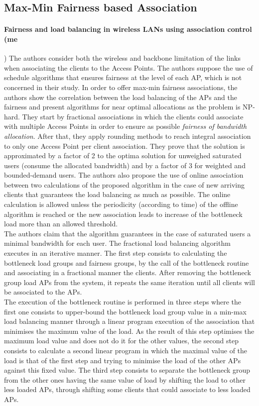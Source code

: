 \documentclass[journal,transmag]{IEEEtran}
\begin{document}
\subsection{Max-Min Fairness based Association}
 \paragraph{Fairness and load balancing in wireless LANs using association control  
\cite{04Fairness_load_balancing_WLAN,07fairness_load_balancing_LAN} (me})
The authors consider both the wireless and backbone limitation of the links when associating the clients to the Access Points. The authors suppose the use of schedule algorithms that ensures fairness at the level of each AP, which is not concerned in their study. In order to offer max-min fairness associations, the authors show the correlation between the load balancing of the APs and the fairness and present algorithms for near optimal allocations as the problem is NP-hard. They start by fractional associations in which the clients could associate with multiple Access Points in order to ensure as possible \textit{fairness of bandwidth allocation}. After that, they apply rounding methods to reach integral association to only one Access Point per client association. They prove that the solution is approximated by a factor of 2 to the optima solution for unweighed saturated users (consume the allocated bandwidth) and by a factor of 3 for weighted and bounded-demand users. The authors also propose the use of online association between two calculations of the proposed algorithm in the case of new arriving clients that guarantees the load balancing as much as possible. The online calculation is allowed unless the periodicity (according to time) of the offline algorithm is reached or the new association leads to increase of the bottleneck load more than an allowed threshold. \\    
The authors claim that the algorithm guarantees in the case of saturated users a minimal bandwidth for each user. The fractional load balancing algorithm executes in an iterative manner. The first step consists to calculating the bottleneck load groups and fairness groups, by the call of the bottleneck routine and associating in a fractional manner the clients. After removing the bottleneck group load APs from the system, it repeats the same iteration until all clients will be associated to the APs.    \\
The execution of the bottleneck routine is performed in three steps where the first one consists to upper-bound the bottleneck load group value in a min-max load balancing manner through a linear program execution of the association that minimises the maximum value of the load. As the result of this step optimises the maximum load value and does not do it for the other values, the second step consists to calculate a second linear program in which the maximal value of the load is that of the first step and trying to minimise the load of the other APs against this fixed value. The third step consists to separate the bottleneck group from the other ones having the same value of load by shifting the load to other less loaded APs, through shifting some clients that could associate to less loaded APs. 
\end{document}
